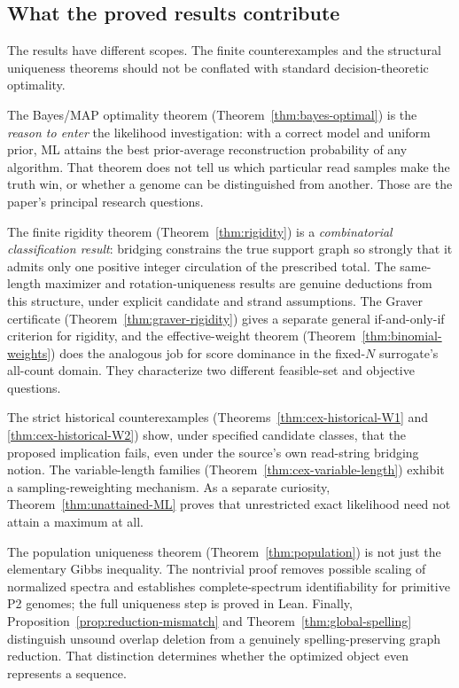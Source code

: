 \subsection{What the proved results contribute}
\label{sec:discussion:proofs}

The results have different scopes. The finite counterexamples
and the structural uniqueness theorems should not be
conflated with standard decision-theoretic optimality.

The Bayes/MAP optimality theorem
(Theorem~\ref{thm:bayes-optimal}) is the \emph{reason to enter} the
likelihood investigation: with a correct model and uniform prior,
ML attains the best prior-average reconstruction probability of
any algorithm. That theorem does not tell us which particular
read samples make the truth win, or whether a genome can be
distinguished from another. Those are the paper's principal
research questions.

The finite rigidity theorem (Theorem~\ref{thm:rigidity}) is a
\emph{combinatorial classification result}: bridging constrains
the true support graph so strongly that it admits only one
positive integer circulation of the prescribed total. The
same-length maximizer and rotation-uniqueness results are
genuine deductions from this structure, under explicit
candidate and strand assumptions. The Graver certificate
(Theorem~\ref{thm:graver-rigidity}) gives a separate general
if-and-only-if criterion for rigidity, and the effective-weight
theorem (Theorem~\ref{thm:binomial-weights}) does the analogous
job for score dominance in the fixed-$N$ surrogate's all-count
domain. They characterize two different feasible-set and objective questions.

The strict historical counterexamples
(Theorems~\ref{thm:cex-historical-W1} and
\ref{thm:cex-historical-W2}) show, under specified candidate classes, that the proposed implication fails, even under the source's own read-string
bridging notion. The variable-length families
(Theorem~\ref{thm:cex-variable-length}) exhibit
a sampling-reweighting mechanism. As a separate curiosity,
Theorem~\ref{thm:unattained-ML} proves that unrestricted
exact likelihood need not attain a maximum at all.

The population uniqueness theorem
(Theorem~\ref{thm:population}) is not just the elementary
Gibbs inequality. The nontrivial proof removes possible scaling
of normalized spectra and establishes complete-spectrum
identifiability for primitive P2 genomes; the full uniqueness step is proved in Lean. Finally,
Proposition~\ref{prop:reduction-mismatch} and
Theorem~\ref{thm:global-spelling} distinguish unsound
overlap deletion from a genuinely spelling-preserving graph
reduction. That distinction determines whether the optimized
object even represents a sequence.

